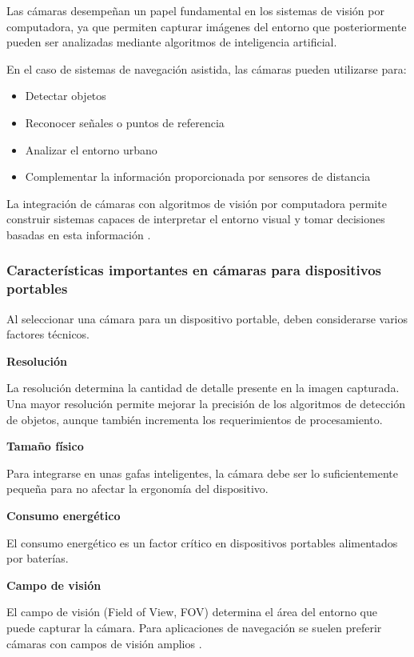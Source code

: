 Las cámaras desempeñan un papel fundamental en los sistemas de visión por computadora, ya que permiten capturar imágenes del entorno que posteriormente pueden ser analizadas mediante algoritmos de inteligencia artificial.

En el caso de sistemas de navegación asistida, las cámaras pueden utilizarse para:

\begin{itemize}
\item Detectar objetos
\item Reconocer señales o puntos de referencia
\item Analizar el entorno urbano
\item Complementar la información proporcionada por sensores de distancia
\end{itemize}

La integración de cámaras con algoritmos de visión por computadora permite construir sistemas capaces de interpretar el entorno visual y tomar decisiones basadas en esta información \cite{raspberrypi_camera_doc}.

\subsubsection{Características importantes en cámaras para dispositivos portables}

Al seleccionar una cámara para un dispositivo portable, deben considerarse varios factores técnicos.

\textbf{Resolución}

La resolución determina la cantidad de detalle presente en la imagen capturada. Una mayor resolución permite mejorar la precisión de los algoritmos de detección de objetos, aunque también incrementa los requerimientos de procesamiento.

\textbf{Tamaño físico}

Para integrarse en unas gafas inteligentes, la cámara debe ser lo suficientemente pequeña para no afectar la ergonomía del dispositivo.

\textbf{Consumo energético}

El consumo energético es un factor crítico en dispositivos portables alimentados por baterías.

\textbf{Campo de visión}

El campo de visión (Field of View, FOV) determina el área del entorno que puede capturar la cámara. Para aplicaciones de navegación se suelen preferir cámaras con campos de visión amplios \cite{arducam_imx219, raspberrypi_camera_doc}.


